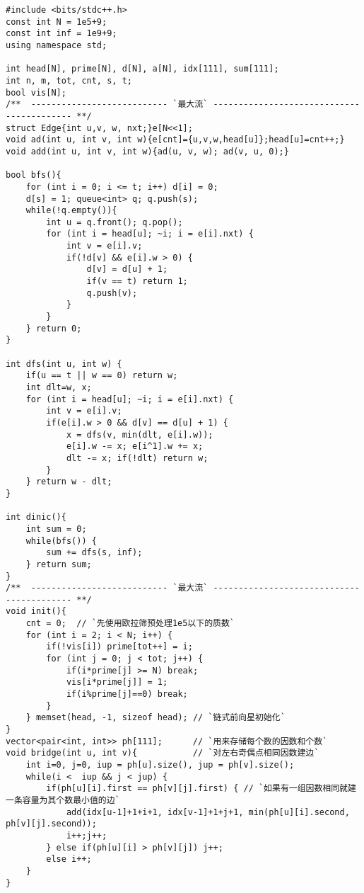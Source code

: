 \begin{lstlisting}
#include <bits/stdc++.h>
const int N = 1e5+9;
const int inf = 1e9+9;
using namespace std;

int head[N], prime[N], d[N], a[N], idx[111], sum[111];
int n, m, tot, cnt, s, t;
bool vis[N];
/**  --------------------------- `最大流` ------------------------------------------ **/
struct Edge{int u,v, w, nxt;}e[N<<1];
void ad(int u, int v, int w){e[cnt]={u,v,w,head[u]};head[u]=cnt++;}
void add(int u, int v, int w){ad(u, v, w); ad(v, u, 0);}

bool bfs(){
    for (int i = 0; i <= t; i++) d[i] = 0;
    d[s] = 1; queue<int> q; q.push(s);
    while(!q.empty()){
        int u = q.front(); q.pop();
        for (int i = head[u]; ~i; i = e[i].nxt) {
            int v = e[i].v;
            if(!d[v] && e[i].w > 0) {
                d[v] = d[u] + 1;
                if(v == t) return 1;
                q.push(v);
            }
        }
    } return 0;
}

int dfs(int u, int w) {
    if(u == t || w == 0) return w;
    int dlt=w, x;
    for (int i = head[u]; ~i; i = e[i].nxt) {
        int v = e[i].v;
        if(e[i].w > 0 && d[v] == d[u] + 1) {
            x = dfs(v, min(dlt, e[i].w));
            e[i].w -= x; e[i^1].w += x;
            dlt -= x; if(!dlt) return w;
        }
    } return w - dlt;
}

int dinic(){
    int sum = 0;
    while(bfs()) {
        sum += dfs(s, inf);
    } return sum;
}
/**  --------------------------- `最大流` ------------------------------------------ **/
void init(){
    cnt = 0;  // `先使用欧拉筛预处理1e5以下的质数`
    for (int i = 2; i < N; i++) {
        if(!vis[i]) prime[tot++] = i;
        for (int j = 0; j < tot; j++) {
            if(i*prime[j] >= N) break;
            vis[i*prime[j]] = 1;
            if(i%prime[j]==0) break;
        }
    } memset(head, -1, sizeof head); // `链式前向星初始化`
}
vector<pair<int, int>> ph[111];      // `用来存储每个数的因数和个数`
void bridge(int u, int v){           // `对左右奇偶点相同因数建边`
    int i=0, j=0, iup = ph[u].size(), jup = ph[v].size();
    while(i <  iup && j < jup) {
        if(ph[u][i].first == ph[v][j].first) { // `如果有一组因数相同就建一条容量为其个数最小值的边`
            add(idx[u-1]+1+i+1, idx[v-1]+1+j+1, min(ph[u][i].second, ph[v][j].second));
            i++;j++;
        } else if(ph[u][i] > ph[v][j]) j++;
        else i++;
    }
}


\end{lstlisting}
